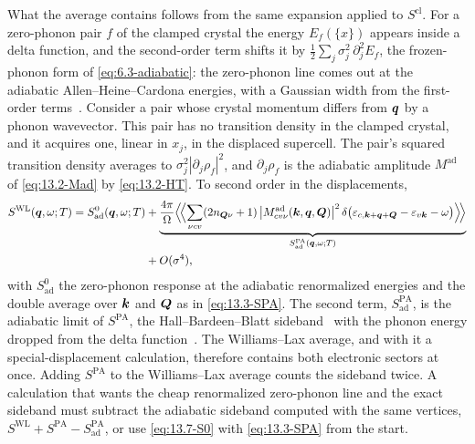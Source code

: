 What the average contains follows from the same expansion applied to $S^{\mathrm{cl}}$. For a zero-phonon pair $f$ of the clamped crystal the energy $E_f(\{x\})$ appears inside a delta function, and the second-order term shifts it by $\frac12\sum_j\sigma_j^2\,\partial_j^2E_f$, the frozen-phonon form of \cref{eq:6.3-adiabatic}: the zero-phonon line comes out at the adiabatic Allen--Heine--Cardona energies, with a Gaussian width from the first-order terms~\cite[Eqs.~(19)--(21)]{zacharias2016one}. Consider a pair whose crystal momentum differs from $\bm{q}$ by a phonon wavevector. This pair has no transition density in the clamped crystal, and it acquires one, linear in $x_j$, in the displaced supercell. The pair's squared transition density averages to $\sigma_j^2|\partial_j\rho_f|^2$, and $\partial_j\rho_f$ is the adiabatic amplitude $M^{\mathrm{ad}}$ of \cref{eq:13.2-Mad} by \cref{eq:13.2-HT}. To second order in the displacements,
\begin{equation}
  \begin{aligned}
  S^{\mathrm{WL}}(\bm{q},\omega;T) = S^0_{\mathrm{ad}}(\bm{q},\omega;T)
  &+ \underbrace{\frac{4\pi}{\Omega}\Bigl\langle\!\Bigl\langle\sum_{\nu cv}(2n_{\bm{Q}\nu} + 1)\,\bigl|M^{\mathrm{ad}}_{cv\nu}(\bm{k},\bm{q},\bm{Q})\bigr|^2\,\delta\bigl(\varepsilon_{c,\bm{k}+\bm{q}+\bm{Q}} - \varepsilon_{v\bm{k}} - \omega\bigr)\Bigr\rangle\!\Bigr\rangle}_{S^{\mathrm{PA}}_{\mathrm{ad}}(\bm{q},\omega;T)} \\
  &+ O(\sigma^4) ,
  \end{aligned}
  \label{eq:13.7-WLexp}
\end{equation}
with $S^0_{\mathrm{ad}}$ the zero-phonon response at the adiabatic renormalized energies and the double average over $\bm{k}$ and $\bm{Q}$ as in \cref{eq:13.3-SPA}. The second term, $S^{\mathrm{PA}}_{\mathrm{ad}}$, is the adiabatic limit of $S^{\mathrm{PA}}$, the Hall--Bardeen--Blatt sideband~\cite{hall1954infrared} with the phonon energy dropped from the delta function~\cite[Eq.~(24)]{zacharias2016one}. The Williams--Lax average, and with it a special-displacement calculation, therefore contains both electronic sectors at once. Adding $S^{\mathrm{PA}}$ to the Williams--Lax average counts the sideband twice. A calculation that wants the cheap renormalized zero-phonon line and the exact sideband must subtract the adiabatic sideband computed with the same vertices, $S^{\mathrm{WL}} + S^{\mathrm{PA}} - S^{\mathrm{PA}}_{\mathrm{ad}}$, or use \cref{eq:13.7-S0} with \cref{eq:13.3-SPA} from the start.

